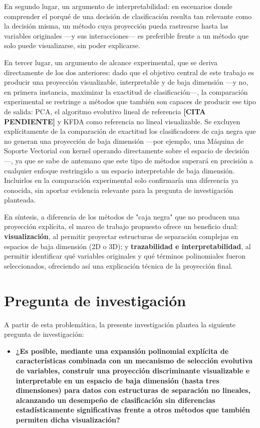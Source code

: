 	En segundo lugar, un argumento de interpretabilidad: en escenarios donde comprender el porqué de una decisión de clasificación resulta tan relevante como la decisión misma, un método cuya proyección pueda rastrearse hasta las variables originales —y sus interacciones— es preferible frente a un método que solo puede visualizarse, sin poder explicarse.
	
	En tercer lugar, un argumento de alcance experimental, que se deriva directamente de los dos anteriores: dado que el objetivo central de este trabajo es producir una proyección visualizable, interpretable y de baja dimensión —y no, en primera instancia, maximizar la exactitud de clasificación—, la comparación experimental se restringe a métodos que también son capaces de producir ese tipo de salida: PCA, el algoritmo evolutivo lineal de referencia \textbf{[CITA PENDIENTE]} y KFDA como referencia no lineal visualizable. Se excluyen explícitamente de la comparación de exactitud los clasificadores de caja negra que no generan una proyección de baja dimensión —por ejemplo, una Máquina de Soporte Vectorial con kernel operando directamente sobre el espacio de decisión—, ya que se sabe de antemano que este tipo de métodos superará en precisión a cualquier enfoque restringido a un espacio interpretable de baja dimensión. Incluirlos en la comparación experimental solo confirmaría una diferencia ya conocida, sin aportar evidencia relevante para la pregunta de investigación planteada.
	
	En síntesis, a diferencia de los métodos de "caja negra" que no producen una proyección explícita, el marco de trabajo propuesto ofrece un beneficio dual: \textbf{visualización}, al permitir proyectar estructuras de separación complejas en espacios de baja dimensión (2D o 3D); y \textbf{trazabilidad e interpretabilidad}, al permitir identificar qué variables originales y qué términos polinomiales fueron seleccionados, ofreciendo así una explicación técnica de la proyección final.
	
	\section{Pregunta de investigación}
	\label{sec:Pregunta-Investigación}
	
	A partir de esta problemática, la presente investigación plantea la siguiente pregunta de
	investigación:
	
	\begin{itemize}
		\item \textbf{¿Es posible, mediante una expansión polinomial explícita de características combinada con un mecanismo de selección evolutiva de variables, construir una proyección discriminante visualizable e interpretable en un espacio de baja dimensión (hasta tres dimensiones) para datos con estructuras de separación no lineales, alcanzando un desempeño de clasificación sin diferencias estadísticamente significativas frente a otros métodos que también permiten dicha visualización?}
	\end{itemize}
	
